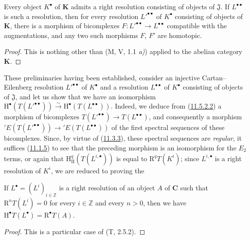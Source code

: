 \begin{corollary}[11.5.2.2]
\label{0.11.5.2.2}
Every object $K^\bullet$ of $\boldsymbol{K}$ admits a right resolution consisting
of objects of $\mathfrak J$. If $L^{\bullet\bullet}$ is such a resolution,
then for every resolution $L'^{\bullet\bullet}$ of $K^\bullet$ consisting of objects
of $\boldsymbol{K}$, there is a morphism of bicomplexes
$F:L'^{\bullet\bullet}\to L^{\bullet\bullet}$ compatible with the
augmentations, and any two such morphisms $F$, $F'$ are homotopic.
\end{corollary}

\begin{proof}
This is nothing other than (M, V, 1.1 \emph{a)}) applied to the abelian category
$\boldsymbol{K}$.
\end{proof}

\begin{env}[11.5.2.3]
\label{0.11.5.2.3}
These preliminaries having been established, consider an injective
Cartan--Eilenberg resolution $L'^{\bullet\bullet}$ of $K^\bullet$ and a
resolution $L^{\bullet\bullet}$ of $K^\bullet$ consisting of objects of
$\mathfrak J$, and let us show that we have an isomorphism $\mathrm H^\bullet(T(L'^{\bullet\bullet}))\xrightarrow{\sim}\mathrm H^\bullet(T(L^{\bullet\bullet}))$.
Indeed, we deduce from (\hyperref[0.11.5.2.2]{11.5.2.2}) a morphism of
bicomplexes $T(L'^{\bullet\bullet})\to T(L^{\bullet\bullet})$, and consequently
a morphism
$'E(T(L'^{\bullet\bullet}))\to{}'E(T(L^{\bullet\bullet}))$ of the first
spectral sequences of these bicomplexes. Since, by virtue of
(\hyperref[0.11.3.3]{11.3.3}), these spectral sequences are \emph{regular}, it
suffices (\hyperref[0.11.1.5]{11.1.5}) to see that the preceding morphism is
an isomorphism for the $E_2$ terms, or again that
$\mathrm H_{\mathrm{II}}^q(T(L^{i,\bullet}))$ is equal to
$\mathrm R^qT(K^i)$; since $L^{i,\bullet}$ is a right resolution of
$K^i$, we are reduced to proving the
\end{env}

\begin{lemma}[11.5.2.4]
\label{0.11.5.2.4}
If $L^\bullet=(L^i)_{i\in\mathbb Z}$ is a right resolution of an object $A$
of $\boldsymbol{C}$ such that $\mathrm R^nT(L^i)=0$ for every $i\in\mathbb Z$ and
every $n>0$, then we have
$\mathrm H^\bullet T(L^\bullet)=\mathrm R^\bullet T(A)$.
\end{lemma}

\begin{proof}
This is a particular case of (T, 2.5.2).
\end{proof}

